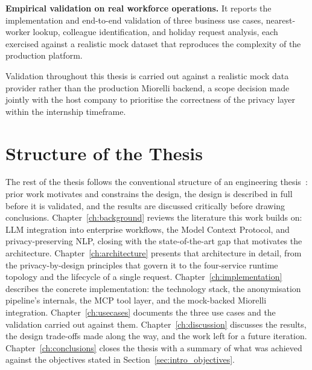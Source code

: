 \textbf{Empirical validation on real workforce operations.} It reports the implementation and end-to-end validation of three business use cases, nearest-worker lookup, colleague identification, and holiday request analysis, each exercised against a realistic mock dataset that reproduces the complexity of the production platform.

Validation throughout this thesis is carried out against a realistic mock data provider rather than the production Miorelli backend, a scope decision made jointly with the host company to prioritise the correctness of the privacy layer within the internship timeframe.

\section{Structure of the Thesis}
\label{sec:intro_structure}

The rest of the thesis follows the conventional structure of an engineering thesis~\cite{eco2017come}: prior work motivates and constrains the design, the design is described in full before it is validated, and the results are discussed critically before drawing conclusions. Chapter~\ref{ch:background} reviews the literature this work builds on: LLM integration into enterprise workflows, the Model Context Protocol, and privacy-preserving NLP, closing with the state-of-the-art gap that motivates the architecture. Chapter~\ref{ch:architecture} presents that architecture in detail, from the privacy-by-design principles that govern it to the four-service runtime topology and the lifecycle of a single request. Chapter~\ref{ch:implementation} describes the concrete implementation: the technology stack, the anonymisation pipeline's internals, the MCP tool layer, and the mock-backed Miorelli integration. Chapter~\ref{ch:usecases} documents the three use cases and the validation carried out against them. Chapter~\ref{ch:discussion} discusses the results, the design trade-offs made along the way, and the work left for a future iteration. Chapter~\ref{ch:conclusions} closes the thesis with a summary of what was achieved against the objectives stated in Section~\ref{sec:intro_objectives}.
